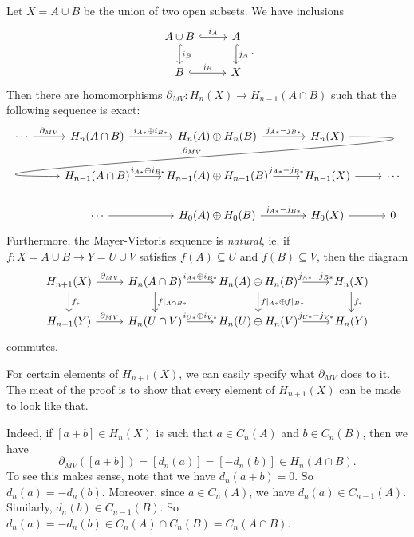 \documentclass[a4paper]{article}
\begin{document}
\begin{thm}
  Let $X = A \cup B$ be the union of two open subsets. We have inclusions
  \[
    \begin{tikzcd}
      A \cup B \ar[r, "i_A", hook] \ar[d, "i_B", hook] & A \ar[d, hook, "j_A"]\\
      B \ar[r, hook, "j_B"] & X
    \end{tikzcd}.
  \]
  Then there are homomorphisms $\partial_{MV}: H_n(X) \to H_{n - 1}(A \cap B)$ such that the following sequence is exact:
  \[
    \begin{tikzcd}
      \cdots \ar[r, "\partial_{MV}"] & H_n(A \cap B) \ar[r, "i_{A*} \oplus i_{B*}"] & H_n(A) \oplus H_n(B) \ar[r, "j_{A*} - j_{B*}"] & H_n(X)\ar[out=0, in=180, looseness=2, overlay, lld, "\partial_{MV}"']\\
      & H_{n - 1}(A \cap B) \ar[r, "i_{A*} \oplus i_{B*}"] & H_{n - 1}(A) \oplus H_{n - 1}(B) \ar[r, "j_{A*} - j_{B*}"] & H_{n - 1}(X) \ar [r] & \cdots\\
      &\cdots \ar[r] & H_0(A) \oplus H_0(B) \ar[r, "j_{A*} - j_{B*}"] & H_0(X) \ar [r] & 0
    \end{tikzcd}
  \]
  Furthermore, the Mayer-Vietoris sequence is \emph{natural}, ie. if $f: X = A\cup B \to Y = U \cup V$ satisfies $f(A) \subseteq U$ and $f(B) \subseteq V$, then the diagram
  \[
    \begin{tikzcd}
       H_{n + 1}(X) \ar[r, "\partial_{MV}"] \ar[d, "f_*"] & H_{n}(A \cap B) \ar[r, "i_{A*} \oplus i_{B*}"] \ar[d, "f|_{A \cap B*}"] & H_n(A) \oplus H_n(B) \ar[r, "j_{A*} - j_{B*}"] \ar[d, "f|_{A*} \oplus f|_{B*}"] & H_n(X) \ar[d, "f_*"]\\
       H_{n + 1}(Y) \ar[r, "\partial_{MV}"] & H_{n}(U \cap V) \ar[r, "i_{U*} \oplus i_{V*}"] & H_n(U) \oplus H_n(V) \ar[r, "j_{U*} - j_{V*}"] & H_n(Y)
    \end{tikzcd}
  \]
  commutes.
\end{thm}
For certain elements of $H_{n + 1}(X)$, we can easily specify what $\partial_{MV}$ does to it. The meat of the proof is to show that every element of $H_{n + 1}(X)$ can be made to look like that.

Indeed, if $[a + b] \in H_n(X)$ is such that $a \in C_n(A)$ and $b \in C_n(B)$, then we have
\[
  \partial_{MV}([a + b]) = [d_n(a)] = [-d_n(b)] \in H_n(A \cap B).
\]
To see this makes sense, note that we have $d_n(a + b) = 0$. So $d_n(a) = - d_n(b)$. Moreover, since $a \in C_n(A)$, we have $d_n(a) \in C_{n - 1}(A)$. Similarly, $d_n(b) \in C_{n - 1}(B)$. So $d_n(a) = - d_n(b) \in C_n(A) \cap C_n(B) = C_n(A \cap B)$.
\end{document}
